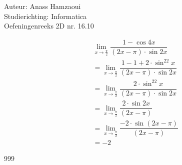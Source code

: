 \documentclass[a4paper]{article}
\begin{document}
  
\noindent \large Auteur: Anass Hamzaoui \\
\noindent \large Studierichting: Informatica \\
\noindent \large Oefeningenreeks 2D nr. 16.10 \\

\medskip

\normalsize

\begin{eqnarray*}
    && \lim\limits_{x\rightarrow \tfrac{\pi}{2}} \dfrac{1-\cos 4x}{(2x-\pi)\cdot\sin 2x} \\
    && = \lim\limits_{x\rightarrow \tfrac{\pi}{2}} \dfrac{1-1+2\cdot\sin^22x}{(2x-\pi)\cdot\sin 2x} \\
    && = \lim\limits_{x\rightarrow \tfrac{\pi}{2}} \dfrac{2\cdot\sin^22x}{(2x-\pi)\cdot\sin 2x} \\
    && = \lim\limits_{x\rightarrow \tfrac{\pi}{2}} \dfrac{2\cdot\sin2x}{(2x-\pi)} \\
    && = \lim\limits_{x\rightarrow \tfrac{\pi}{2}} \dfrac{-2\cdot\sin(2x-\pi)}{(2x-\pi)} \\
    && = -2
\end{eqnarray*}

\begin{thebibliography}{999}
\end{thebibliography}
\end{document}
